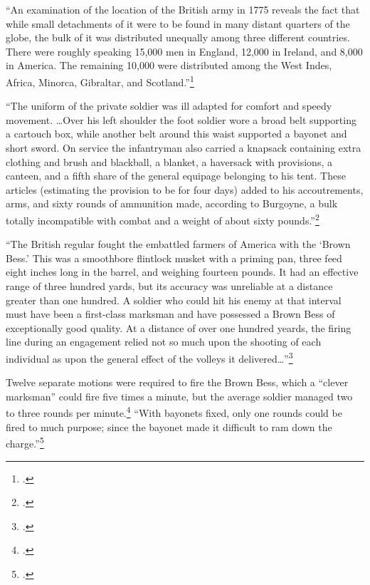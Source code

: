 ``An examination of the location of the British army in 1775 reveals the fact
that while small detachments of it were to be found in many distant quarters of
the globe, the bulk of it was distributed unequally among three different
countries. There were roughly speaking 15,000 men in England, 12,000 in
Ireland, and 8,000 in America. The remaining 10,000 were distributed among the
West Indes, Africa, Minorca, Gibraltar, and
Scotland.''\footcite[2]{curtis_org_1972}


``The uniform of the private soldier was ill adapted for comfort and speedy
movement. \ldots Over his left shoulder the foot soldier wore a broad belt
supporting a cartouch box, while another belt around this waist supported a
bayonet and short sword. On service the infantryman also carried a knapsack
containing extra clothing and brush and blackball, a blanket, a haversack with
provisions, a canteen, and a fifth share of the general equipage belonging to
his tent. These articles (estimating the provision to be for four days) added
to his accoutrements, arms, and sixty rounds of ammunition made, according to
Burgoyne, a bulk totally incompatible with combat and a weight of about sixty
pounds.''\footcite[14-15]{curtis_org_1972}

``The British regular fought the embattled farmers of America with the `Brown
Bess.' This was a smoothbore flintlock musket with a priming pan, three feed
eight inches long in the barrel, and weighing fourteen pounds. It had an
effective range of three hundred yards, but its accuracy was unreliable at a
distance greater than one hundred. A soldier who could hit his enemy at that
interval must have been a first-class marksman and have possessed a Brown Bess
of exceptionally good quality. At a distance of over one hundred yeards, the
firing line during an engagement relied not so much upon the shooting of each
individual as upon the general effect of the volleys it
delivered\ldots''\footcite[16]{curtis_org_1972}

Twelve separate motions were required to fire the Brown Bess, which a ``clever
marksman'' could fire five times a minute, but the average soldier managed two
to three rounds per minute.\footcite[17]{curtis_org_1972} ``With bayonets fixed,
only one rounds could be fired to much purpose; since the bayonet made it
difficult to ram down the charge.''\footcite[17]{curtis_org_1972}

